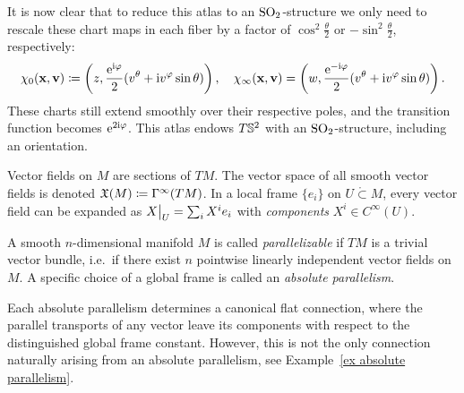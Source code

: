 \begin{example}
    It is now clear that to reduce this atlas to an $\operatorname{SO}_2$-structure we only need to rescale these chart maps in each fiber by a factor of $\cos^2\frac{\theta}{2}$ or $-\sin^2\frac{\theta}{2}$, respectively:
    \[\chi_0(\mathbf{x},\mathbf{v})\coloneqq \left(z,\frac{\mathrm{e}^{\mathrm{i}\varphi}}{2}(v^\theta+\mathrm{i} v^\varphi\sin\theta) \right),\quad \chi_\infty(\mathbf{x},\mathbf{v})=\left(w,\frac{\mathrm{e}^{-\mathrm{i}\varphi}}{2}(v^\theta+\mathrm{i} v^\varphi\sin\theta )\right).\] 
    These charts still extend smoothly over their respective poles, and the transition function becomes $\mathrm{e}^{2\mathrm{i}\varphi}$. This atlas endows $T\mathbb{S}^2$ with an $\operatorname{SO}_2$-structure, including an orientation.
\end{example}


\begin{defn}
    Vector fields on $M$ are sections of $TM$. The vector space of all smooth vector fields is denoted $\mathfrak{X}(M)\coloneqq \Gamma^\infty(TM)$. In a local frame $\{e_i\}$ on $U\mathring{\subset}M$, every vector field can be expanded as $\restr{X}{U}=\sum_i X^i e_i$ with \emph{components} $X^i\in C^\infty(U)$.
\end{defn}

\begin{defn}[Parallelism]\label{def parallelizable}
    A smooth $n$-dimensional manifold $M$ is called \emph{parallelizable} if $TM$ is a trivial vector bundle, i.e.\ if there exist $n$ pointwise linearly independent vector fields on $M$. A specific choice of a global frame is called an \emph{absolute parallelism}.
\end{defn}

\begin{rem}
     Each absolute parallelism determines a canonical flat connection, where the parallel transports of any vector leave its components with respect to the distinguished global frame constant. However, this is not the only connection naturally arising from an absolute parallelism, see Example~\ref{ex absolute parallelism}.
\end{rem}

